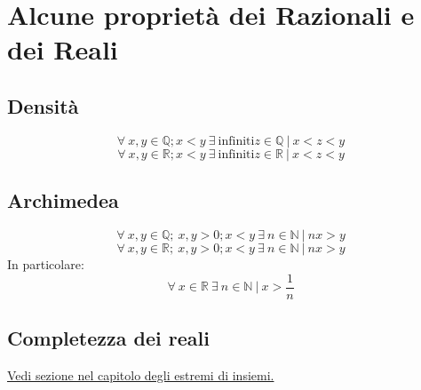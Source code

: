\chapter{Alcune proprietà dei Razionali e dei Reali}
\section{Densità}
\begin{equation*}
\forall\ x,y \in \mathbb{Q}; x<y\ \exists\ \text{infiniti} z \in \mathbb{Q}\ |\ x<z<y
\end{equation*}
\begin{equation*}
\forall\ x,y \in \mathbb{R}; x<y\ \exists\ \text{infiniti} z \in \mathbb{R}\ |\ x<z<y
\end{equation*}

\section{Archimedea}
\begin{equation*}
\forall\ x,y \in \mathbb{Q};\ x,y > 0; x<y\ \exists\ n \in \mathbb{N}\ |\ nx>y
\end{equation*}
\begin{equation*}
\forall\ x,y \in \mathbb{R};\ x,y > 0; x<y\ \exists\ n \in \mathbb{N}\ |\ nx>y
\end{equation*}
In particolare:
\begin{equation*}
\forall\ x \in \mathbb{R}\ \exists\ n \in \mathbb{N}\ |\ x>\frac{1}{n}
\end{equation*}

\section{Completezza dei reali}
\hyperref[sec: CompletezzaReali]{\color{cyan}Vedi sezione nel capitolo degli estremi di insiemi.}